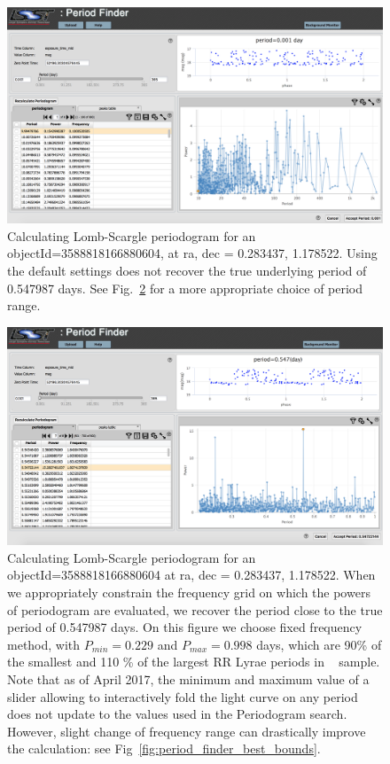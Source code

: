 \documentclass[DM,lsstdraft,toc,usenatbib]{lsstdoc}
\begin{document}
\begin{figure}
\includegraphics[width=\textwidth]{figs/Period_finder_defaults}
\caption{Calculating Lomb-Scargle periodogram for  an objectId=3588818166880604, at ra, dec = 0.283437\degree, 1.178522\degree. Using the default settings  does not recover the true underlying period of 0.547987 days. See Fig.~\ref{fig:period_finder_custom} for a more appropriate choice of period range.}
\label{fig:period_finder_default}
\end{figure}




\begin{figure}
\includegraphics[width=\textwidth]{figs/Period_finder_fix_freq_0229-0998}
\caption{Calculating Lomb-Scargle periodogram for an objectId=3588818166880604 at  ra, dec = 0.283437\degree, 1.178522\degree . When we appropriately constrain the frequency grid on which the powers of periodogram are evaluated, we recover the period close to the true period of  0.547987 days.  On this figure we choose fixed frequency method,  with $P_{min} =  0.229 $ and $P_{max} = 0.998$ days, which are 90\% of the smallest and 110 \% of the largest RR Lyrae periods in ~\citep{sesar2010} sample. Note that as of April 2017, the minimum and maximum value of a slider allowing to interactively fold the light curve on any period does not update to the values used in the Periodogram search. However, slight change of frequency range can drastically improve the calculation: see Fig~\ref{fig:period_finder_best_bounds}. }
\label{fig:period_finder_custom}
\end{figure}
\end{document}
